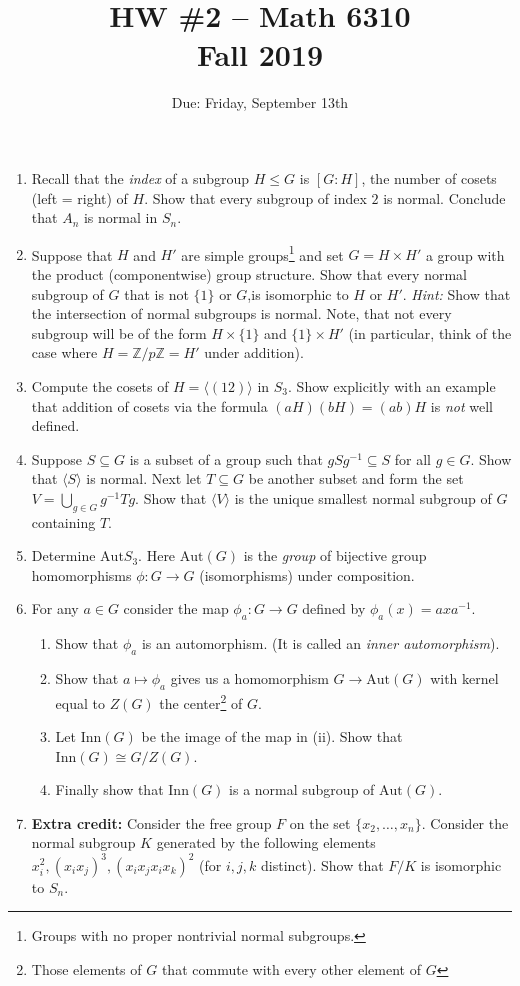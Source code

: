 \documentclass[11pt]{amsart}
\renewcommand{\to}[1][]{\xrightarrow{\ #1\ }}
\newcommand{\bZ}{\mathbb{Z}}
\newcommand{\Inn}{\mathrm{Inn}}
\newcommand{\Aut}{\mathrm{Aut}}
\begin{document}
\title{HW \#2 -- Math 6310\\Fall 2019}
\author{Due: Friday, September 13th}
\maketitle

\begin{enumerate}
    \item Recall that the \emph{index} of a subgroup $H \leq G$ is $[G : H]$, the number of cosets (left = right) of $H$.  Show that every subgroup of index $2$ is normal.  Conclude that $A_n$ is normal in $S_n$.
    \newpage
    \item Suppose that $H$ and $H'$ are simple groups\footnote{Groups with no proper nontrivial normal subgroups.} and set $G = H \times H'$ a group with the product (componentwise) group structure.  Show that every normal subgroup of $G$ that is not $\{1\}$ or $G$,is isomorphic to $H$ or $H'$.  \vskip 3pt
        \emph{Hint:} Show that the intersection of normal subgroups is normal.  Note, that not every subgroup will be of the form $H \times \{1\}$ and $\{1\} \times H'$ (in particular, think of the case where $H = \bZ/p\bZ = H'$ under addition).
    \newpage
    \item Compute the cosets of $H = \langle (12) \rangle$ in $S_3$.  Show explicitly with an example that addition of cosets via the formula $(a H) (b H) = (ab) H$ is \emph{not} well defined.
    \newpage
    \item   Suppose $S \subseteq G$ is a subset of a group such that $g S g^{-1} \subseteq S$ for all $g \in G$.  Show that $\langle S \rangle$ is normal.  Next let $T \subseteq G$ be another subset and form the set $V = \bigcup_{g \in G} g^{-1} T g$.  Show that $\langle V \rangle$ is the unique smallest normal subgroup of $G$ containing $T$.
    \newpage
    \item Determine $\Aut S_3$.  Here $\Aut(G)$ is the \emph{group} of bijective group homomorphisms $\phi : G \to G$ (isomorphisms) under composition.
    \newpage
    \item For any $a \in G$ consider the map $\phi_a : G \to G$ defined by $\phi_a(x) = axa^{-1}$.
    \begin{enumerate}
        \item Show that $\phi_a$ is an automorphism.  (It is called an \emph{inner automorphism}).
        \item  Show that $a \mapsto \phi_a$ gives us a homomorphism $G \to \Aut(G)$ with kernel equal to $Z(G)$  the center\footnote{Those elements of $G$ that commute with every other element of $G$} of $G$.
        \item  Let $\Inn(G)$ be the image of the map in (ii).  Show that $\Inn(G) \cong G/Z(G)$.
        \item  Finally show that $\Inn(G)$ is a normal subgroup of $\Aut(G)$.
    \end{enumerate}
    \newpage
    \item {\bf Extra credit: }
    Consider the free group $F$ on the set $\{x_2, \dots, x_{n} \}$.  Consider the normal subgroup $K$ generated by the following elements $x_i^2, (x_i x_j)^3, (x_i x_j x_i x_k)^2$ (for $i,j,k$ distinct).  Show that $F/K$ is isomorphic to $S_n$.
\end{enumerate}
\end{document}
